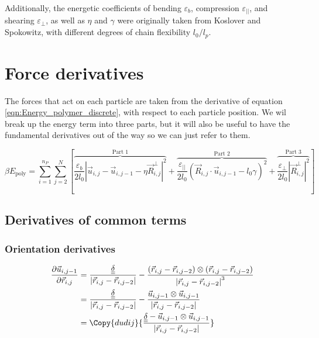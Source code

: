 \documentclass{article}
\renewcommand{\ij}{_{i,j}}
\newcommand{\ijj}{_{i,j-1}}
\newcommand{\ijk}{_{i,j-2}}
\newcommand{\ijjj}{_{i,j-2}}
\newcommand{\magn}[1]{\left\vert #1 \right\vert }
\renewcommand{\part}[2]{\frac{\partial #1 }{\partial #2}}
\newcommand{\ten}[1]{\underline{\underline{#1}}}
\newcommand{\rij}{\vec{r} \ij}
\newcommand{\rijjj}{\vec{r} \ijjj}
\newcommand{\rijk}{\vec{r} \ijk}
\newcommand{\uijj}{\vec{u} \ijj}
\begin{document}
\noindent
Additionally, the energetic coefficients of bending $\varepsilon_b$,
compression $\varepsilon_{\vert \vert}$, and shearing $\varepsilon_\perp$, as
well as $\eta$ and $\gamma$ were originally taken from Koslover and Spokowitz, with
different degrees of chain flexibility \(l_0/l_p\).


\section{Force derivatives}

The forces that act on each particle are taken from the derivative of equation
\ref{eqn:Energy_polymer_discrete}, with respect to each particle position. We
wil break up the energy term into three parts, but it will also be useful to have the fundamental derivatives out of the way so we can just refer to them.

\begin{equation}
  \label{eqn:Energy_polymer_broken}
  \beta E_{\text{poly}}  =  \sum_{i=1}^{n_P}  \sum_{j=2}^{N} \left[
  \overbrace{\frac{\varepsilon_b}{2 l_0}  
  \magn{ \vec{u} \ij - \vec{u} \ijj - \eta \vec{R}\ij ^\bot} ^2}^{\text{Part 1}} 
  +
  \overbrace{
   \frac{\varepsilon_{\vert \vert}}{2 l_0} 
   \left( \vec{R}\ij \cdot \vec{u} \ijj - l_0 \gamma \right)^2 }
   ^{\text{Part 2}}
   +
   \overbrace{\frac{\varepsilon _\perp}
   {2l_0} \magn{\vec{R}\ij ^\perp}^2} ^ {\text{Part 3}}
  \right]
\end{equation}

\subsection{Derivatives of common terms}
\subsubsection{Orientation derivatives}

\begin{align*}
  \part{\vec{u} \ijj }{\vec{r} \ij} 
  &= \frac{\ten{\delta }}{\magn{\vec{r} \ij - \vec{r} \ijjj}} - 
  \frac{
    \left(\rij - \rijk \right)\otimes 
  \left(\rij - \rijk \right)
  }{
    \magn{\rij - \rijjj } ^3
    }
  \\
  &
  =
  \frac{\ten{\delta}}{\magn{\rij - \rijjj}} 
  -
  \frac{\uijj \otimes \uijj}{\magn{\rij - \rijjj}}\\
  &  =
  \Copy{dudij}
  {
  \frac{\ten{\delta} - \uijj \otimes \uijj}{\magn{\rij - \rijjj}}
  }
\end{align*}
\end{document}

